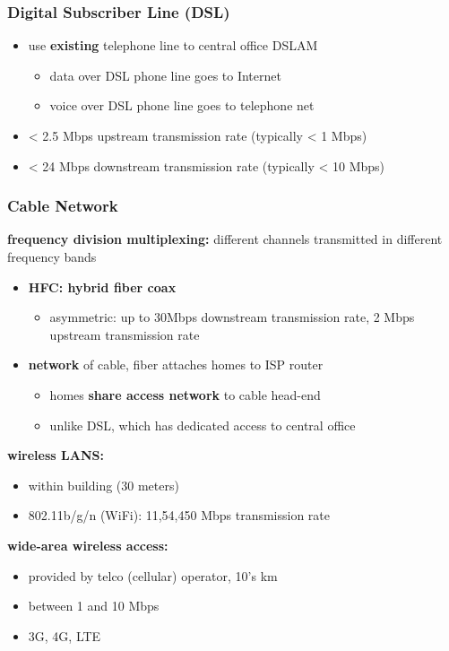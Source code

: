 \subsubsection{Digital Subscriber Line (DSL)}
\begin{itemize}
	\item use \textbf{existing} telephone line to central office DSLAM
	\begin{itemize}
		\item data over DSL phone line goes to Internet
		\item voice over DSL phone line goes to telephone net
	\end{itemize}
	\item < 2.5 Mbps upstream transmission rate (typically < 1 Mbps)
	\item < 24 Mbps downstream transmission rate (typically < 10 Mbps)
\end{itemize}
\subsubsection{Cable Network}
\begin{leftbar}
	\textbf{frequency division multiplexing:} different channels transmitted in different frequency bands
\end{leftbar}
\begin{itemize}
	\item \textbf{HFC: hybrid fiber coax}
	\begin{itemize}
		\item asymmetric: up to 30Mbps downstream transmission rate, 2 Mbps upstream transmission rate
	\end{itemize}
	\item \textbf{network} of cable, fiber attaches homes to ISP router
	\begin{itemize}
		\item homes \textbf{share access network} to cable head-end
		\item unlike DSL, which has dedicated access to central office
	\end{itemize}
\end{itemize}
\textbf{wireless LANS:}
\begin{itemize}
	\item within building (30 meters)
	\item 802.11b/g/n (WiFi): 11,54,450 Mbps transmission rate
\end{itemize}
\textbf{wide-area wireless access:}
\begin{itemize}
	\item provided by telco (cellular) operator, 10's km
	\item between 1 and 10 Mbps
	\item 3G, 4G, LTE
\end{itemize}


